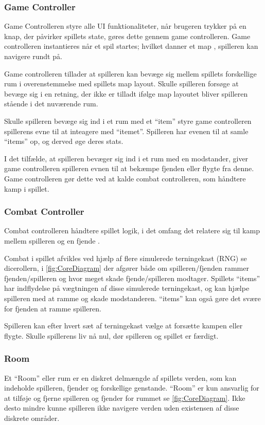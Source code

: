 \subsubsection{Game Controller}
Game Controlleren styre alle UI funktionaliteter, når brugeren
trykker på en knap, der påvirker spillets state, gøres dette
gennem game controlleren. Game controlleren instantieres når
et spil startes; hvilket danner et map \parencite[Section 10.3.1][]
{TekniskBilag}, spilleren kan navigere rundt på. 

Game controlleren tillader at spilleren kan bevæge sig mellem
spillets forskellige rum \parencite[Section 9.3.1][]{TekniskBilag} 
i overenstemmelse med spillets map layout. Skulle spilleren forsøge at
bevæge sig i en retning, der ikke er tilladt ifølge map layoutet bliver 
spilleren stående i det nuværende rum.

Skulle spilleren bevæge sig ind i et rum med et ``item'' styre 
game controlleren spillerens evne til at inteagere med ``itemet''.
Spilleren har evenen til at samle ``items'' op, og derved øge deres
stats.

I det tilfælde, at spilleren bevæger sig ind i et rum med en modstander,
giver game controlleren spilleren evnen til at bekæmpe fjenden eller
flygte fra denne. Game controlleren gør dette ved at kalde combat controlleren,
som håndtere kamp i spillet.

\subsubsection{Combat Controller}
Combat controlleren håndtere spillet logik, i det omfang det relatere sig til
kamp mellem spilleren og en fjende \parencite[Section 9.3.3][Figur 17]{TekniskBilag}.

Combat i spillet afvikles ved hjælp af flere simulerede terningekast (RNG) se dicerollern,
i \autoref{fig:CoreDiagram} der afgører både om spilleren/fjenden rammer fjenden/spilleren 
og hvor meget skade fjende/spilleren modtager. Spillets ``items'' har indflydelse
på vægtningen af disse simulerede terningekast, og kan hjælpe spilleren med at ramme og skade 
modstanderen. ``items'' kan også gøre det svære for fjenden at ramme spilleren.

Spilleren kan efter hvert sæt af terningekast vælge at forsætte kampen eller
flygte. Skulle spillerens liv nå nul, dør spilleren og spillet er færdigt.

\subsubsection{Room}
Et ``Room'' eller rum er en diskret delmængde af spillets verden, som kan indeholde
spilleren, fjender og forskellige genstande. ``Room'' er kun ansvarlig for at tilføje
og fjerne spilleren og fjender for rummet se \autoref{fig:CoreDiagram}. Ikke desto mindre
kunne spilleren ikke navigere verden uden existensen af disse diskrete områder.

